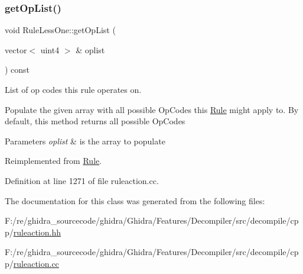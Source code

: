 \subsubsection{\texorpdfstring{getOpList()}{getOpList()}}
{\footnotesize\ttfamily void Rule\+Less\+One\+::get\+Op\+List (\begin{DoxyParamCaption}\item[{vector$<$ uint4 $>$ \&}]{oplist }\end{DoxyParamCaption}) const\hspace{0.3cm}{\ttfamily [virtual]}}



List of op codes this rule operates on. 

Populate the given array with all possible Op\+Codes this \mbox{\hyperlink{class_rule}{Rule}} might apply to. By default, this method returns all possible Op\+Codes 
\begin{DoxyParams}{Parameters}
{\em oplist} & is the array to populate \\
\hline
\end{DoxyParams}


Reimplemented from \mbox{\hyperlink{class_rule_a4023bfc7825de0ab866790551856d10e}{Rule}}.



Definition at line 1271 of file ruleaction.\+cc.



The documentation for this class was generated from the following files\+:\begin{DoxyCompactItemize}
\item 
F\+:/re/ghidra\+\_\+sourcecode/ghidra/\+Ghidra/\+Features/\+Decompiler/src/decompile/cpp/\mbox{\hyperlink{ruleaction_8hh}{ruleaction.\+hh}}\item 
F\+:/re/ghidra\+\_\+sourcecode/ghidra/\+Ghidra/\+Features/\+Decompiler/src/decompile/cpp/\mbox{\hyperlink{ruleaction_8cc}{ruleaction.\+cc}}\end{DoxyCompactItemize}
